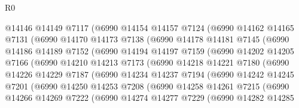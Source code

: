 \begin{lexlean}{R0}
\begin{coremodule}
              @14146
              @14149
              @7117
              (@6990
                @14154
                @14157
                @7124
                (@6990
                  @14162
                  @14165
                  @7131
                  (@6990
                    @14170
                    @14173
                    @7138
                    (@6990
                      @14178
                      @14181
                      @7145
                      (@6990
                        @14186
                        @14189
                        @7152
                        (@6990
                          @14194
                          @14197
                          @7159
                          (@6990
                            @14202
                            @14205
                            @7166
                            (@6990
                              @14210
                              @14213
                              @7173
                              (@6990
                                @14218
                                @14221
                                @7180
                                (@6990
                                  @14226
                                  @14229
                                  @7187
                                  (@6990
                                    @14234
                                    @14237
                                    @7194
                                    (@6990
                                      @14242
                                      @14245
                                      @7201
                                      (@6990
                                        @14250
                                        @14253
                                        @7208
                                        (@6990
                                          @14258
                                          @14261
                                          @7215
                                          (@6990
                                            @14266
                                            @14269
                                            @7222
                                            (@6990
                                              @14274
                                              @14277
                                              @7229
                                              (@6990
                                                @14282
                                                @14285

\end{coremodule}
\end{lexlean}
